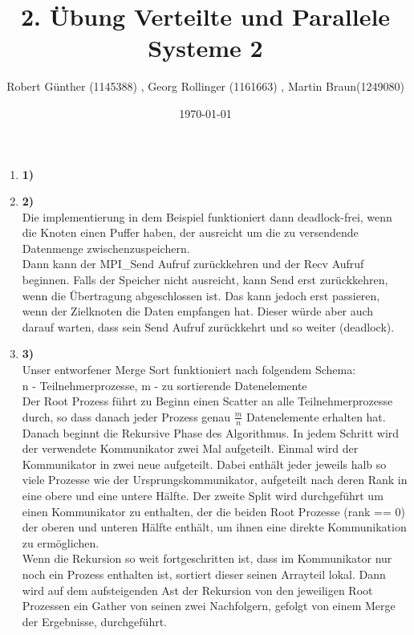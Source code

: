 \documentclass[10pt,a4paper]{article}
\title{2. Übung Verteilte und Parallele Systeme 2}
\author{ Robert Günther (1145388) , Georg Rollinger (1161663) , Martin Braun(1249080)}
\date{\today{}}
\begin{document}
\maketitle
\begin{enumerate}

\item[]{\textbf{1)} \\

}

\item[]{\textbf{2)} \\
Die implementierung in dem Beispiel funktioniert dann deadlock-frei, wenn die Knoten einen Puffer haben, der ausreicht um die zu versendende Datenmenge zwischenzuspeichern.\\
Dann kann der MPI_Send Aufruf zurückkehren und der Recv Aufruf beginnen. Falls der Speicher nicht ausreicht, kann Send erst zurückkehren, wenn die Übertragung abgeschlossen ist.
Das kann jedoch erst passieren, wenn der Zielknoten die Daten empfangen hat. Dieser würde aber auch darauf warten, dass sein Send Aufruf zurückkehrt und so weiter (deadlock).
}

\item[]{\textbf{3)} \\
Unser entworfener Merge Sort funktioniert nach folgendem Schema: \\
n - Teilnehmerprozesse, m - zu sortierende Datenelemente \\
Der Root Prozess führt zu Beginn einen Scatter an alle Teilnehmerprozesse durch, so dass danach jeder Prozess genau $\frac{m}{n}$ Datenelemente erhalten hat. 
Danach beginnt die Rekursive Phase des Algorithmus. In jedem Schritt wird der verwendete Kommunikator zwei Mal aufgeteilt.
Einmal wird der Kommunikator in zwei neue aufgeteilt. Dabei enthält jeder jeweils halb so viele Prozesse wie der Ursprungskommunikator, aufgeteilt nach deren Rank in eine obere und eine untere Hälfte. 
Der zweite Split wird durchgeführt um einen Kommunikator zu enthalten, der die beiden Root Prozesse (rank == 0) der oberen und unteren Hälfte enthält, um ihnen eine direkte Kommunikation zu ermöglichen.\\

Wenn die Rekursion so weit fortgeschritten ist, dass im Kommunikator nur noch ein Prozess enthalten ist, sortiert dieser seinen Arrayteil lokal. Dann wird auf dem aufsteigenden Ast der Rekursion von den jeweiligen Root Prozessen ein Gather von seinen zwei Nachfolgern, gefolgt von einem Merge der Ergebnisse, durchgeführt.
}
\end{enumerate}
\end{document}
